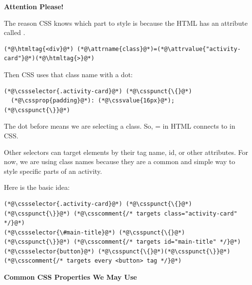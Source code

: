 \documentclass{article}
\begin{document}
\vspace{0.3cm}


\begin{attentionbox}
  \textbf{\Bitter\textcolor{naranja}{Attention Please!}}

  The reason CSS knows which part to style is because the HTML has an attribute called \textbf{}.

  \begin{lstlisting}
(*@\htmltag{<div}@*) (*@\attrname{class}@*)=(*@\attrvalue{"activity-card"}@*)(*@\htmltag{>}@*)
\end{lstlisting}

  Then CSS uses that class name with a dot:

  \begin{lstlisting}
(*@\cssselector{.activity-card}@*) (*@\csspunct{\{}@*)
  (*@\cssprop{padding}@*): (*@\cssvalue{16px}@*);
(*@\csspunct{\}}@*)
\end{lstlisting}

  The dot before  means we are selecting a class.
  So, = in HTML connects to  in CSS.

  Other selectors can target elements by their tag name, id, or other attributes.
  For now, we are using class names because they are a common and simple way to style specific parts of an activity.

  \vspace{0.15cm}

  Here is the basic idea:

  \begin{lstlisting}
(*@\cssselector{.activity-card}@*) (*@\csspunct{\{}@*)(*@\csspunct{\}}@*) (*@\csscomment{/* targets class="activity-card" */}@*)
(*@\cssselector{\#main-title}@*) (*@\csspunct{\{}@*)(*@\csspunct{\}}@*) (*@\csscomment{/* targets id="main-title" */}@*)
(*@\cssselector{button}@*) (*@\csspunct{\{}@*)(*@\csspunct{\}}@*) (*@\csscomment{/* targets every <button> tag */}@*)
\end{lstlisting}

\end{attentionbox}

\vspace{0.4cm}

\textbf{\Bitter\textcolor{naranja}{Common CSS Properties We May Use}}

\vspace{0.1cm}
\end{document}
